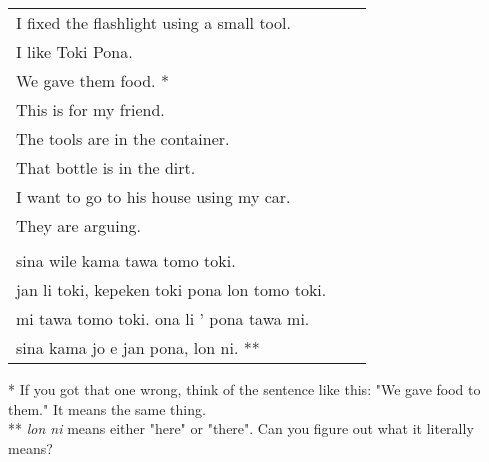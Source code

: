 \begin{supertabular}{p{5,5cm}|ll}
I fixed the flashlight using a small tool.  &&  \\ %
I like Toki Pona.   &&   \\ %
We gave them food. * &&    \\ %
This is for my friend.   &&   \\ %
The tools are in the container.   &&   \\ %
That bottle is in the dirt.  &&    \\ %
I want to go to his house using my car.  &&   \\  %
They are arguing.   &&   \\ %
&& \\ %
sina wile kama tawa tomo toki.   &&   \\ %
jan li toki, kepeken toki pona lon tomo toki.  &&    \\ %
mi tawa tomo toki. ona li ' pona tawa mi.  &&   \\  %
sina kama jo e jan pona, lon ni. **  &&   \\ %
\end{supertabular} 

* If you got that one wrong, think of the sentence like this: 
"We gave food to them." It means the same thing. \\
** \textit{lon ni} means either "here" or "there". 
Can you figure out what it literally means? 
%
